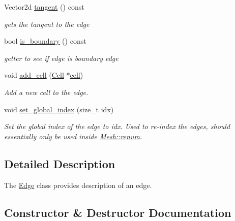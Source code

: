 \begin{DoxyCompactItemize}
\mbox{\label{classHArDCore2D_1_1Edge_a9715e93a4b7ecdfef2dba91e9fbec8ff}} 
Vector2d \hyperlink{classHArDCore2D_1_1Edge_a9715e93a4b7ecdfef2dba91e9fbec8ff}{tangent} () const
\begin{DoxyCompactList}\small\item\em gets the tangent to the edge \end{DoxyCompactList}\item 
bool \hyperlink{group__Mesh_ga10424f4b99793ab359b5dd099f9255ee}{is\+\_\+boundary} () const
\begin{DoxyCompactList}\small\item\em getter to see if edge is boundary edge \end{DoxyCompactList}\item 
\mbox{\label{classHArDCore2D_1_1Edge_a364bacf89dfa0be36abbbadbb2dd4f78}} 
void \hyperlink{classHArDCore2D_1_1Edge_a364bacf89dfa0be36abbbadbb2dd4f78}{add\+\_\+cell} (\hyperlink{classHArDCore2D_1_1Cell}{Cell} $\ast$\hyperlink{classHArDCore2D_1_1Edge_ad4be0bfb981ccf2c1e02e870772dbdc3}{cell})
\begin{DoxyCompactList}\small\item\em Add a new cell to the edge. \end{DoxyCompactList}\item 
\mbox{\label{classHArDCore2D_1_1Edge_a150b8b31cd1b608d6ce8b020227a6db2}} 
void \hyperlink{classHArDCore2D_1_1Edge_a150b8b31cd1b608d6ce8b020227a6db2}{set\+\_\+global\+\_\+index} (size\+\_\+t idx)
\begin{DoxyCompactList}\small\item\em Set the global index of the edge to idx. Used to re-\/index the edges, should essentially only be used inside \hyperlink{classHArDCore2D_1_1Mesh_af77873bbc892a7a5b37bf4773c55aefc}{Mesh\+::renum}. \end{DoxyCompactList}\end{DoxyCompactItemize}


\subsection{Detailed Description}
The \hyperlink{classHArDCore2D_1_1Edge}{Edge} class provides description of an edge. 

\subsection{Constructor \& Destructor Documentation}
\mbox{\label{classHArDCore2D_1_1Edge_a1bca27244cfcd45e24e0b7485f148ddf}} 
